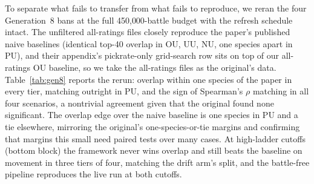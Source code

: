 \documentclass[journal]{IEEEtran}
\begin{document}
To separate what fails to transfer from what fails to reproduce, we reran
the four Generation~8 bans at the full 450{,}000-battle budget with the
refresh schedule intact. The unfiltered all-ratings files closely
reproduce the paper's published naive baselines (identical top-40 overlap
in OU, UU, NU, one species apart in PU), and their appendix's pickrate-only
grid-search row sits on top of our all-ratings OU baseline, so we take the
all-ratings files as the original's data. Table~\ref{tab:gen8} reports the
rerun: overlap within one species of the paper in every tier, matching
outright in PU, and the sign of Spearman's $\rho$ matching in all four
scenarios, a nontrivial agreement given that the original found none
significant. The overlap edge over the naive baseline is one species in PU
and a tie elsewhere, mirroring the original's one-species-or-tie margins
and confirming that margins this small need paired tests over many cases.
At high-ladder cutoffs (bottom block) the framework never wins overlap and
still beats the baseline on movement in three tiers of four, matching the
drift arm's split, and the battle-free pipeline reproduces the live run at
both cutoffs.
\end{document}
